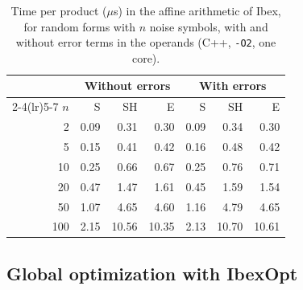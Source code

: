 \documentclass[11pt]{article}
\theoremstyle{definition}
\begin{document}
\begin{table}[t]
\centering
\caption{Time per product ($\mu$s) in the affine arithmetic of Ibex, for random forms with $n$ noise symbols, with and without error terms in the operands (C++, \texttt{-O2}, one core).}
\label{tab:cost}
\small
\begin{tabular}{rrrrrrr}
\toprule
 & \multicolumn{3}{c}{Without errors} & \multicolumn{3}{c}{With errors} \\
\cmidrule(lr){2-4}\cmidrule(lr){5-7}
$n$ & S & SH & E & S & SH & E \\
\midrule
2 & 0.09 & 0.31 & 0.30 & 0.09 & 0.34 & 0.30 \\
5 & 0.15 & 0.41 & 0.42 & 0.16 & 0.48 & 0.42 \\
10 & 0.25 & 0.66 & 0.67 & 0.25 & 0.76 & 0.71 \\
20 & 0.47 & 1.47 & 1.61 & 0.45 & 1.59 & 1.54 \\
50 & 1.07 & 4.65 & 4.60 & 1.16 & 4.79 & 4.65 \\
100 & 2.15 & 10.56 & 10.35 & 2.13 & 10.70 & 10.61 \\
\bottomrule
\end{tabular}
\end{table}

\subsection{Global optimization with IbexOpt}
\label{sec:solver}
\end{document}
